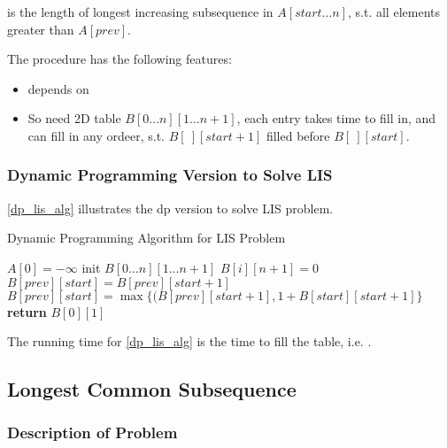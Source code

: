  is the length of longest increasing
subsequence in $A[start\ldots n]$, s.t. all elements greater than 
$A[prev]$.

\observation

The procedure  has the following features:

\begin{itemize}
    \item {} depends on 
    \item So need 2D table $B[0\ldots n][1\ldots n+1]$, each entry takes
         time to fill in, and can fill in any ordeer,
        s.t. $B[\ ][start+1]$ filled before $B[\ ][start]$.
\end{itemize}


\subsubsection{Dynamic Programming Version to Solve LIS}
\cref{dp_lis_alg} illustrates the dp version to solve LIS problem.

\begin{algorithm}[H]
\caption{Dynamic Programming Algorithm for LIS Problem}\label{dp_lis_alg}
\begin{algorithmic}[1]
\State $A[0] = -\infty$
\State init $B[0\ldots n][1\ldots n+1]$
    \State $B[i][n+1]=0$
\EndFor
{}
            \State $B[prev][start] = B[prev][start + 1]$
        \Else
        \State $B[prev][start] = \max\{(B[prev][start + 1], 1 + B[start][start + 1]\}$
        \EndIf
    \EndFor
\EndFor
\State \textbf{return} $B[0][1]$
\EndProcedure
\end{algorithmic}
\end{algorithm}

The running time for \cref{dp_lis_alg} is the time to fill the table, i.e. .

\subsection{Longest Common Subsequence}

\subsubsection{Description of Problem}

